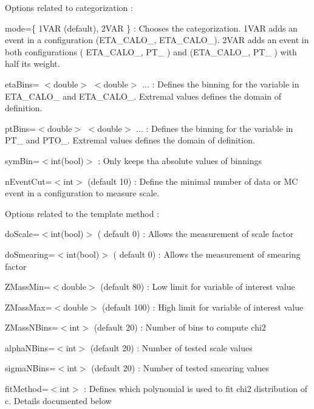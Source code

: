 Options related to categorization \+:
\begin{DoxyItemize}
\item mode=\{ 1\+V\+A\+R (default), 2\+V\+A\+R \} \+: Chooses the categorization. 1\+V\+A\+R adds an event in a configuration (E\+T\+A\+\_\+\+C\+A\+L\+O\+\_, E\+T\+A\+\_\+\+C\+A\+L\+O\+\_). 2\+V\+A\+R adds an event in both configurations ( E\+T\+A\+\_\+\+C\+A\+L\+O\+\_, P\+T\+\_ ) and (E\+T\+A\+\_\+\+C\+A\+L\+O\+\_, P\+T\+\_ ) with half its weight.
\item eta\+Bins= $<$double$>$ $<$double$>$ ... \+: Defines the binning for the variable in E\+T\+A\+\_\+\+C\+A\+L\+O\+\_ and E\+T\+A\+\_\+\+C\+A\+L\+O\+\_. Extremal values defines the domain of definition.
\item pt\+Bins=$<$double$>$ $<$double$>$ ... \+: Defines the binning for the variable in P\+T\+\_ and P\+T\+O\+\_. Extremal values defines the domain of definition.
\item sym\+Bin=$<$int(bool)$>$ \+: Only keeps tha absolute values of binnings
\item n\+Event\+Cut=$<$int$>$ (default 10) \+: Define the minimal number of data or M\+C event in a configuration to measure scale.
\end{DoxyItemize}

Options related to the template method \+:
\begin{DoxyItemize}
\item do\+Scale=$<$int(bool)$>$ ( default 0) \+: Allows the measurement of scale factor
\item do\+Smearing=$<$int(bool)$>$ ( default 0) \+: Allows the measurement of smearing factor
\item Z\+Mass\+Min=$<$double$>$ (default 80) \+: Low limit for variable of interest value
\item Z\+Mass\+Max=$<$double$>$ (default 100) \+: High limit for variable of interest value
\item Z\+Mass\+N\+Bins=$<$int$>$ (default 20) \+: Number of bins to compute chi2
\item alpha\+N\+Bins=$<$int$>$ (default 20) \+: Number of tested scale values
\item sigma\+N\+Bins=$<$int$>$ (default 20) \+: Number of tested smearing values
\item fit\+Method=$<$int$>$ \+: Defines which polynomial is used to fit chi2 distribution of c. Details documented below
\end{DoxyItemize}

